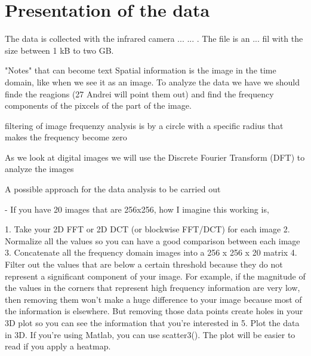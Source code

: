 \section{Presentation of the data}

The data is collected with the infrared camera ... ... . The file is an ... fil with the size between 1 kB to two GB.


"Notes" that can become text
Spatial information is the image in the time domain, like when we see it as an image. 
To analyze the data we have we should finde the reagions (27 Andrei will point them out) and find the frequency components of the pixcels of the part of the image. 

filtering of image frequenzy analysis is by a circle with a specific radius that makes the frequency become zero

As we look at digital images we will use the Discrete Fourier Transform (DFT) to analyze the images


A possible approach for the data analysis to be carried out 

- If you have 20 images that are 256x256, how I imagine this working is,

1. Take your 2D FFT or 2D DCT (or blockwise FFT/DCT) for each image
2. Normalize all the values so you can have a good comparison between each image
3. Concatenate all the frequency domain images into a 256 x 256 x 20 matrix
4. Filter out the values that are below a certain threshold because they do not represent a significant component of your image. For example, if the magnitude of the values in the corners that represent high frequency information are very low, then removing them won't make a huge difference to your image because most of the information is elsewhere. But removing those data points create holes in your 3D plot so you can see the information that you're interested in
5. Plot the data in 3D. If you're using Matlab, you can use scatter3(). The plot will be easier to read if you apply a heatmap.

